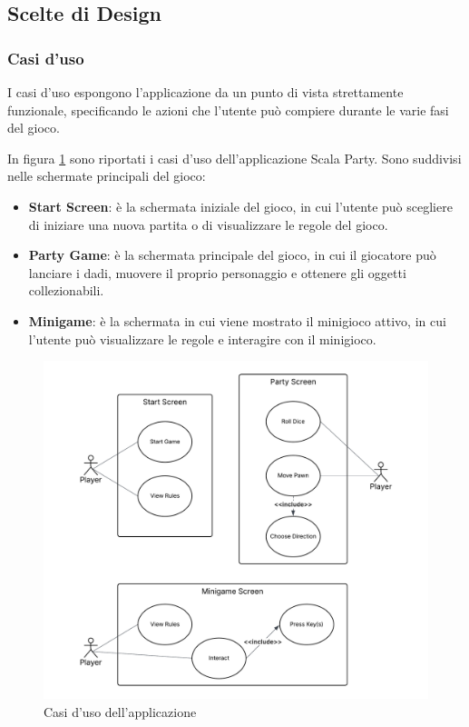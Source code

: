 \subsection{Scelte di Design} \label{sec:design-choices}

\subsubsection{Casi d'uso} \label{sec:design-choices:use-cases}
I casi d'uso espongono l'applicazione da un punto di vista strettamente funzionale,
specificando le azioni che l'utente può compiere durante le varie fasi del gioco.

In figura \ref{fig:use-cases} sono riportati i casi d'uso dell'applicazione Scala Party.
Sono suddivisi nelle schermate principali del gioco:
\begin{itemize}
    \item \textbf{Start Screen}: è la schermata iniziale del gioco, in cui l'utente
    può scegliere di iniziare una nuova partita o di visualizzare le regole del gioco.
    \item \textbf{Party Game}: è la schermata principale del gioco, in cui il giocatore
    può lanciare i dadi, muovere il proprio personaggio e ottenere gli oggetti collezionabili.
    \item \textbf{Minigame}: è la schermata in cui viene mostrato il minigioco
    attivo, in cui l'utente può visualizzare le regole e interagire con il minigioco.
\end{itemize}

\begin{figure}[ht!]
    \centering
    \includegraphics[width=\textwidth]{figures/use-cases.png}
    \caption{Casi d'uso dell'applicazione}
    \label{fig:use-cases}
\end{figure}

